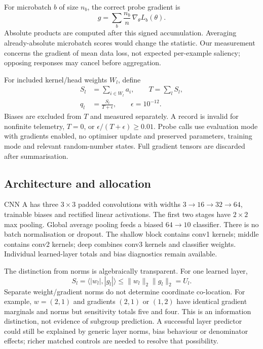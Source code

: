 \documentclass[nolineno]{ieeeaccess}
\begin{document}
For microbatch $b$ of size $n_b$, the correct probe gradient is
\begin{equation}
g=\sum_b\frac{n_b}{n}\,\nabla_\theta L_b(\theta).
\label{eq:microbatch}
\end{equation}
Absolute products are computed after this signed accumulation. Averaging already-absolute microbatch scores would change the statistic. Our measurement concerns the gradient of mean data loss, not expected per-example saliency; opposing responses may cancel before aggregation.

For included kernel/head weights $W_l$, define
\begin{equation}
\begin{aligned}
S_l&=\sum_{i\in W_l}a_i,\qquad T=\sum_lS_l,\\
q_l&=\frac{S_l}{T+\epsilon},\qquad\epsilon=10^{-12}.
\end{aligned}
\label{eq:shares}
\end{equation}
Biases are excluded from $T$ and measured separately. A record is invalid for nonfinite telemetry, $T=0$, or $\epsilon/(T+\epsilon)\geq0.01$. Probe calls use evaluation mode with gradients enabled, no optimiser update and preserved parameters, training mode and relevant random-number states. Full gradient tensors are discarded after summarisation.

\subsection{Architecture and allocation}
CNN A has three $3\times3$ padded convolutions with widths $3\!\rightarrow\!16\!\rightarrow\!32\!\rightarrow\!64$, trainable biases and rectified linear activations. The first two stages have $2\times2$ max pooling. Global average pooling feeds a biased $64\!\rightarrow\!10$ classifier. There is no batch normalisation or dropout. The shallow block contains conv1 kernels; middle contains conv2 kernels; deep combines conv3 kernels and classifier weights. Individual learned-layer totals and bias diagnostics remain available.

The distinction from norms is algebraically transparent. For one learned layer,
\begin{equation}
S_l=\langle|w_l|,|g_l|\rangle
\leq\|w_l\|_2\|g_l\|_2=U_l.
\label{eq:norm}
\end{equation}
Separate weight/gradient norms do not determine coordinate co-location. For example, $w=(2,1)$ and gradients $(2,1)$ or $(1,2)$ have identical gradient marginals and norms but sensitivity totals five and four. This is an information distinction, not evidence of subgroup prediction. A successful layer predictor could still be explained by generic layer norms, bias behaviour or denominator effects; richer matched controls are needed to resolve that possibility.
\end{document}
